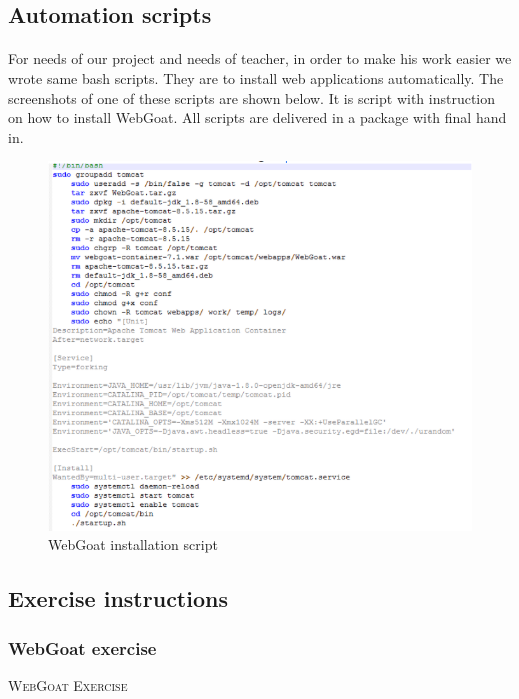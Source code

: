 \documentclass[12pt, a4paper]{article}
\begin{document}
\subsection{Automation scripts}
\paragraph{}For needs of our project and needs of teacher, in order to make his work easier we wrote same bash scripts. They are to install web applications automatically. The screenshots of one of these scripts are shown below. It is script with instruction on how to install WebGoat. All scripts are delivered in a package with final hand in.

\begin{figure}[H]
\includegraphics[width=1.0\textwidth]{webGoatScript.png}
\caption{WebGoat installation script}
\end{figure}

\newpage{}

\subsection{Exercise instructions}

\subsubsection{WebGoat exercise}
		\begin{center} \textsc{WebGoat Exercise}
		\end{center}
\end{document}
